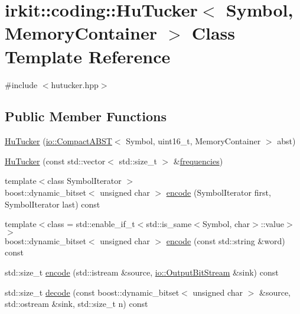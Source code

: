 \hypertarget{classirkit_1_1coding_1_1HuTucker}{}\section{irkit\+:\+:coding\+:\+:Hu\+Tucker$<$ Symbol, Memory\+Container $>$ Class Template Reference}
\label{classirkit_1_1coding_1_1HuTucker}


{\ttfamily \#include $<$hutucker.\+hpp$>$}

\subsection*{Public Member Functions}
\begin{DoxyCompactItemize}
\item 
\mbox{\hyperlink{classirkit_1_1coding_1_1HuTucker_aa491f386d09d0e9c56f3f3558f2774a3}{Hu\+Tucker}} (\mbox{\hyperlink{classirkit_1_1io_1_1CompactABST}{io\+::\+Compact\+A\+B\+ST}}$<$ Symbol, uint16\+\_\+t, Memory\+Container $>$ abst)
\item 
\mbox{\hyperlink{classirkit_1_1coding_1_1HuTucker_ab4c34694c7ffc702a59468d18d355fec}{Hu\+Tucker}} (const std\+::vector$<$ std\+::size\+\_\+t $>$ \&\mbox{\hyperlink{irk-uncompress_8cpp_a2cd80733ced3d7eda8a6de0389cccc73}{frequencies}})
\item 
{\footnotesize template$<$class Symbol\+Iterator $>$ }\\boost\+::dynamic\+\_\+bitset$<$ unsigned char $>$ \mbox{\hyperlink{classirkit_1_1coding_1_1HuTucker_adde9798abd87416b4f2484126833dae5}{encode}} (Symbol\+Iterator first, Symbol\+Iterator last) const
\item 
{\footnotesize template$<$class  = std\+::enable\+\_\+if\+\_\+t$<$std\+::is\+\_\+same$<$\+Symbol, char$>$\+::value$>$$>$ }\\boost\+::dynamic\+\_\+bitset$<$ unsigned char $>$ \mbox{\hyperlink{classirkit_1_1coding_1_1HuTucker_aebcf6aaac07270505616093d3a0d745c}{encode}} (const std\+::string \&word) const
\item 
std\+::size\+\_\+t \mbox{\hyperlink{classirkit_1_1coding_1_1HuTucker_a11a91f141460bec521b307b50ab89ebe}{encode}} (std\+::istream \&source, \mbox{\hyperlink{classirkit_1_1io_1_1OutputBitStream}{io\+::\+Output\+Bit\+Stream}} \&sink) const
\item 
std\+::size\+\_\+t \mbox{\hyperlink{classirkit_1_1coding_1_1HuTucker_a05dd8e7288464b8e5176d2d07e5a9430}{decode}} (const boost\+::dynamic\+\_\+bitset$<$ unsigned char $>$ \&source, std\+::ostream \&sink, std\+::size\+\_\+t n) const

\end{DoxyCompactItemize}
